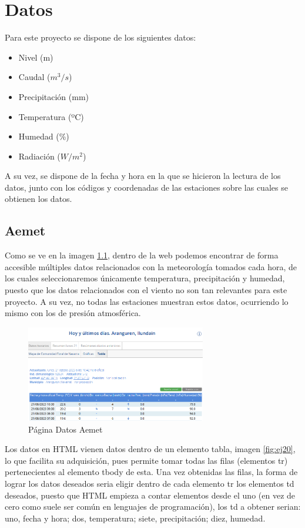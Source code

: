 \chapter[Datos]{Datos}
\label{Chap2}

Para este proyecto se dispone de los siguientes datos:
\begin{itemize}
	\item Nivel (m)
	\item Caudal ($m^3/s$)
	\item Precipitación (mm)
	\item Temperatura (ºC)
	\item Humedad (\%)
	\item Radiación ($W/m^2$)
\end{itemize}
A su vez, se dispone de la fecha y hora en la que se hicieron la lectura de los datos, junto con los códigos y coordenadas de las estaciones sobre las cuales se obtienen los datos.

\section{Aemet}
Como se ve en la imagen \ref{fig:ej3}, dentro de la web podemos encontrar de forma accesible múltiples datos relacionados con la meteorología tomados cada hora, de los cuales seleccionaremos únicamente temperatura, precipitación y humedad, puesto que los datos relacionados con el viento no son tan relevantes para este proyecto. A su vez, no todas las estaciones muestran estos datos, ocurriendo lo mismo con los de presión atmosférica.

\begin{figure} [H]
	\centering
	\includegraphics[width=0.7\textwidth]{fig/AemetData.png}
	\caption[Página Aemet de la estación en Aranguren (Navarra)]{Página Datos Aemet}
	\label{fig:ej3}
\end{figure}

Los datos en HTML vienen datos dentro de un elemento tabla, imagen \ref{fig:ej20}, lo que facilita su adquisición, pues permite tomar todas las filas (elementos tr) pertenecientes al elemento tbody de esta. Una vez obtenidas las filas, la forma de lograr los datos deseados seria eligir dentro de cada elemento tr los elementos td deseados, puesto que HTML empieza a contar elementos desde el uno (en vez de cero como suele ser común en lenguajes de programación), los td a obtener serian: uno, fecha y hora; dos, temperatura; siete, precipitación; diez, humedad.

